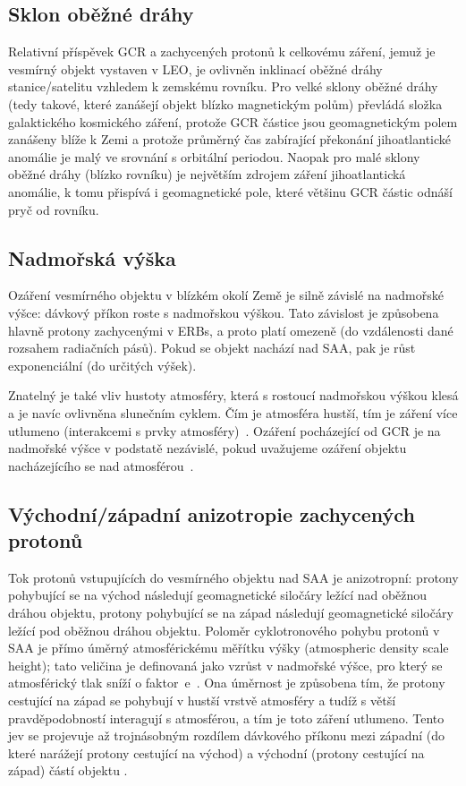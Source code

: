 \subsection{Sklon oběžné dráhy}
Relativní příspěvek GCR a zachycených protonů k celkovému záření, jemuž je vesmírný objekt vystaven v LEO, je ovlivněn inklinací oběžné dráhy stanice/satelitu vzhledem k zemskému rovníku. Pro velké sklony oběžné dráhy (tedy takové, které zanášejí objekt blízko magnetickým polům) převládá složka galaktického kosmického záření, protože GCR částice jsou geomagnetickým polem zanášeny blíže k Zemi a protože průměrný čas zabírající překonání jihoatlantické anomálie je malý ve srovnání s orbitální periodou. Naopak pro malé sklony oběžné dráhy (blízko rovníku) je největším zdrojem záření jihoatlantická anomálie, k tomu přispívá i geomagnetické pole, které většinu GCR částic odnáší pryč od rovníku.
\subsection{Nadmořská výška}\label{sec:kosmickeZareni_altitude}
Ozáření vesmírného objektu v blízkém okolí Země je silně závislé na nadmořské výšce: dávkový příkon roste s nadmořskou výškou. Tato závislost je způsobena hlavně protony zachycenými v ERBs, a proto platí omezeně (do vzdálenosti dané rozsahem radiačních pásů). Pokud se objekt nachází nad SAA, pak je růst exponenciální (do určitých výšek). 

Znatelný je také vliv hustoty atmosféry, která s rostoucí nadmořskou výškou klesá a je navíc ovlivněna slunečním cyklem. Čím je atmosféra hustší, tím je záření více utlumeno (interakcemi s prvky atmosféry)~\cite{benton}. Ozáření pocházející od GCR je na nadmořské výšce v podstatě nezávislé, pokud uvažujeme ozáření objektu nacházejícího se nad atmosférou~\cite{dosis}. 
\subsection{Východní/západní anizotropie zachycených protonů}\label{sec:kosmickeZareni_anizotropie}
Tok protonů vstupujících do vesmírného objektu nad SAA je anizotropní: protony pohybující se na východ následují geomagnetické siločáry ležící nad oběžnou dráhou objektu, protony pohybující se na západ následují geomagnetické siločáry ležící pod oběžnou dráhou objektu. Poloměr cyklotronového pohybu protonů v SAA %
je přímo úměrný atmosférickému měřítku výšky (atmospheric density scale height); tato veličina je definovaná jako vzrůst v nadmořské výšce, pro který se atmosférický tlak sníží o faktor~e~\cite{scaleHeight_wiki}. Ona úměrnost je způsobena tím, že protony cestující na západ se pohybují v hustší vrstvě atmosféry a tudíž s větší pravděpodobností interagují s atmosférou, a tím je toto záření utlumeno. Tento jev se projevuje až trojnásobným rozdílem dávkového příkonu mezi západní (do které narážejí protony cestující na východ) a východní (protony cestující na západ) částí objektu \cite{benton}. 
